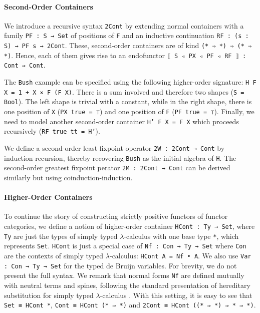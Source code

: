 \documentclass{easychair}
\begin{document}
\paragraph{Second-Order Containers}
We introduce a recursive syntax \texttt{2Cont} by extending normal containers with a family
\texttt{PF : S → Set} of positions of \texttt{F} and an inductive continuation \texttt{RF : (s : S) → PF s → 2Cont}.
These, second-order containers are of kind \texttt{(* ⇒ *) ⇒ (* ⇒ *)}. Hence, each of them gives rise to an endofunctor \texttt{⟦ S ◃ PX ◃ PF ◃ RF ⟧ : Cont ⇒ Cont}.

The \texttt{Bush} example can be specified using the following higher-order signature:
\texttt{H F X = 1 + X × F (F X)}. There is a sum involved and therefore two shapes
(\texttt{S = Bool}). The left shape is trivial with a constant, while in the right
shape, there is one position of \texttt{X} (\texttt{PX true = ⊤}) and one position of
\texttt{F} (\texttt{PF true = ⊤}). Finally, we need to model another second-order container
\texttt{H' F X = F X} which proceeds recursively (\texttt{RF true tt = H'}).

We define a second-order least fixpoint operator \texttt{2W : 2Cont → Cont} by
induction-recursion, thereby recovering \texttt{Bush} as the initial algebra of
\texttt{H}. The second-order greatest fixpoint perator \texttt{2M : 2Cont → Cont} 
can be derived similarly but using coinduction-induction.

\paragraph{Higher-Order Containers}
To continue the story of constructing strictly positive functors of functor
categories, we define a notion of higher-order container \texttt{HCont : Ty → Set}, where
\texttt{Ty} are just the types of simply typed $\lambda$-calculus with one base type
\texttt{*}, which represents \texttt{Set}. \texttt{HCont} is just a special case of
\texttt{Nf : Con → Ty → Set} where \texttt{Con} are the contexts of simply typed
$\lambda$-calculus: \texttt{HCont A = Nf • A}. We also use \texttt{Var : Con → Ty → Set}
for the typed de Bruijn variables. For brevity, we do not present the full
syntax. We remark that normal forms \texttt{Nf} are defined mutually with neutral terms
and spines, following the standard presentation of hereditary substitution for
simply typed $\lambda$-calculus \cite{keller2010normalization}. With this setting,
it is easy to see that \texttt{Set ≅ HCont *}, \texttt{Cont ≅ HCont (* ⇒ *)} and
\texttt{2Cont ≅ HCont ((* ⇒ *) ⇒ * ⇒ *)}. 
\end{document}
